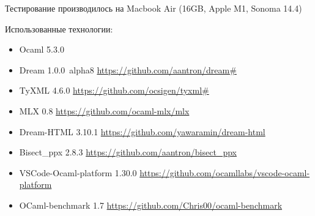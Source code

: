 Тестирование производилось на Macbook Air (16GB, Apple M1, Sonoma 14.4)

Использованные технологии:
\begin{itemize}
    \item Ocaml 5.3.0
    \item Dream 1.0.0~alpha8 \url{https://github.com/aantron/dream#}
    \item TyXML 4.6.0 \url{https://github.com/ocsigen/tyxml#}
    \item MLX 0.8 \url{https://github.com/ocaml-mlx/mlx}
    \item Dream-HTML 3.10.1 \url{https://github.com/yawaramin/dream-html}
    \item Bisect\_ppx 2.8.3 \url{https://github.com/aantron/bisect_ppx}
    \item VSCode-Ocaml-platform 1.30.0 \url{https://github.com/ocamllabs/vscode-ocaml-platform}
    \item OCaml-benchmark 1.7 \url{https://github.com/Chris00/ocaml-benchmark}
\end{itemize}
